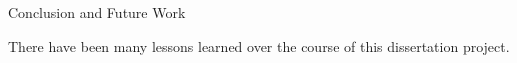 \documentclass[main.tex]{subfiles}
\begin{document}

Conclusion and Future Work

There have been many lessons learned over the course of this dissertation project.%
\end{document}
